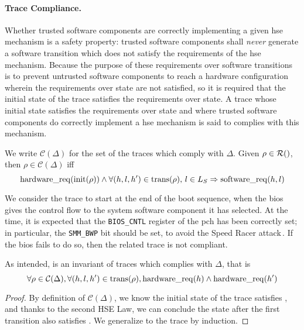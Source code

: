 \paragraph{Trace Compliance.}
%
Whether trusted software components are correctly implementing a given \ac{hse}
mechanism is a safety property: trusted software components shall \emph{never}
generate a software transition which does not satisfy the requirements of the
\ac{hse} mechanism.
%
Because the purpose of these requirements over software transitions is to
prevent untrusted software components to reach a hardware configuration wherein
the requirements over state are not satisfied, so it is required that the
initial state of the trace satisfies the requirements over state.
%
A trace whose initial state satisfies the requirements over state and where
trusted software components do correctly implement a \ac{hse} mechanism is said
to complies with this mechanism.
%
\begin{definition}
  We write $\mathcal{C}(\Delta)$ for the set of the traces which comply with
  $\Delta$.
  Given $\rho \in \pathesLTS{Ez}$, then $\rho \in \mathcal{C}(\Delta)$ iff
  \[
    \mathrm{hardware\_req}(\mathrm{init}(\rho)) \wedge \forall (h,l,h') \in
    \mathrm{trans}(\rho)\text{, }l \in L_S \Rightarrow \mathrm{software\_req}(h, l)
  \]
\end{definition}

\begin{example}
  We consider the trace to start at the end of the boot sequence, when the
  \ac{bios} gives the control flow to the system software component it has
  selected.
  At the time, it is expected that the \texttt{BIOS\_CNTL} register of the
  \ac{pch} has been correctly set; in particular, the \texttt{SMM\_BWP} bit
  should be set, to avoid the Speed Racer
  attack\,\cite{kallenberg2015racecondition}.
  If the \ac{bios} fails to do so, then the related trace is not compliant.
\end{example}

\begin{lemma}
  \label{lemma:speccert:hseinv}
  As intended,  is an invariant of traces which complies
  with $\Delta$, that is
  \[
    \forall \rho \in \mathcal{C}(\Delta), \forall (h, l, h') \in
    \mathrm{trans}(\rho), \mathrm{hardware\_req}(h) \wedge \mathrm{hardware\_req}(h')
  \]

  \begin{proof}
    By definition of $\mathcal{C}(\Delta)$, we know the initial state of the
    trace satisfies , and thanks to the second HSE Law, we
    can conclude the state after the first transition also satisfies
    .
    We generalize to the trace by induction.
  \end{proof}
\end{lemma}

